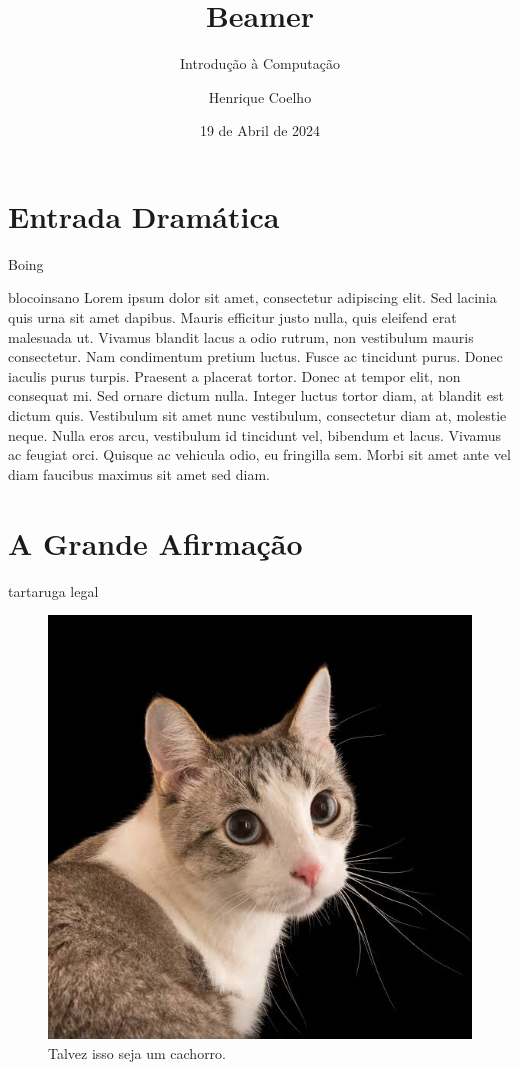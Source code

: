 \documentclass{beamer}
\title{Beamer}
\subtitle{Introdução à Computação}
\author{Henrique Coelho}
\institute{Fundação Getúlio Vargas - EMAp}
\date{19 de Abril de 2024}
\begin{document}
\begin{frame}[plain]
    \maketitle
\end{frame}
\section{Entrada Dramática}
\begin{frame}{Boing}
	\begin{block}{blocoinsano}
	Lorem ipsum dolor sit amet, consectetur adipiscing elit. Sed lacinia quis urna sit amet dapibus. Mauris efficitur justo nulla, quis eleifend erat malesuada ut. Vivamus blandit lacus a odio rutrum, non vestibulum mauris consectetur. Nam condimentum pretium luctus. Fusce ac tincidunt purus. Donec iaculis purus turpis. Praesent a placerat tortor. Donec at tempor elit, non consequat mi. Sed ornare dictum nulla. Integer luctus tortor diam, at blandit est dictum quis. Vestibulum sit amet nunc vestibulum, consectetur diam at, molestie neque. Nulla eros arcu, vestibulum id tincidunt vel, bibendum et lacus. Vivamus ac feugiat orci. Quisque ac vehicula odio, eu fringilla sem. Morbi sit amet ante vel diam faucibus maximus sit amet sed diam.
	\end{block}
\end{frame}
\section{A Grande Afirmação}
\begin{frame}{tartaruga legal}
	\begin{figure}[h!]
		\centering
		\includegraphics[width=0.5\linewidth]{Imagens/gato}
		\caption[Gato INSANO]{Talvez isso seja um cachorro.}
		\label{fig:gato}
	\end{figure}
\end{frame}
\end{document}
